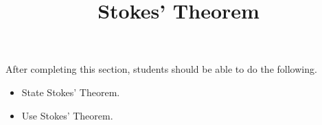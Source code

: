 \documentclass{ximera}
\title{Stokes' Theorem}
\begin{document}
\begin{abstract}
\end{abstract}

\maketitle

\begin{sectionOutcomes}
After completing this section, students should be able to do the following.

\begin{itemize}
\item State Stokes' Theorem.
\item Use Stokes' Theorem.
\end{itemize}
\end{sectionOutcomes}
\end{document}
